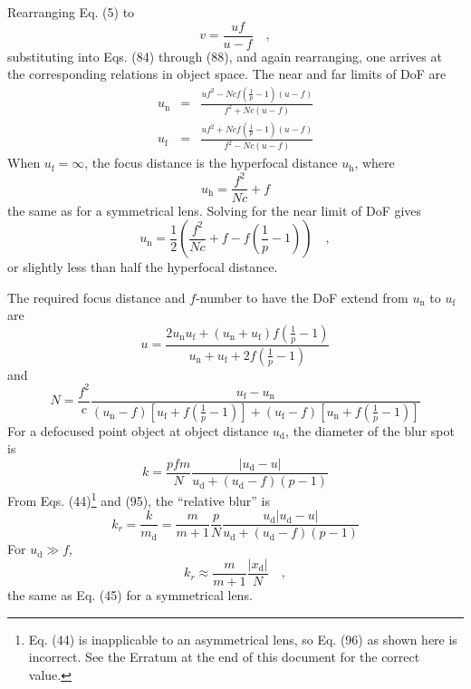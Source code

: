 \documentclass[11pt, oneside]{scrartcl}   	%
\begin{document}
Rearranging Eq. (5) to
\begin{equation}
  \label{eq:5v}
  v = \frac{uf}{u-f}\quad,
\end{equation}
%
substituting into Eqs. (84) through (88), and again rearranging, one
arrives at the corresponding relations in object space. The near and
far limits of DoF are
\begin{eqnarray}
     u_\mathrm{n} & = & \frac{uf^2 -  N\!cf\left(\frac1p-1\right)(u-f)}{f^2 + N\!c(u-f)}\label{eq:89}\\
     u_\mathrm{f} & = & \frac{uf^2 + N\!cf\left(\frac1p-1\right)(u-f)}{f^2 - N\!c(u-f)}\label{eq:90}
\end{eqnarray}
When $u_\mathrm{f} = \infty$, the focus distance is the hyperfocal distance
$u_\mathrm{h}$, where
\begin{equation}
  \label{eq:uh2}
  u_\mathrm{h} = \frac{f^2}{N\!c} + f
\end{equation}
the same as for a symmetrical lens. Solving for the near limit of DoF gives
\begin{equation}
  \label{eq:3un}
  u_\mathrm{n} = \frac12 \left(\frac{f^2}{N\!c} + f - f\left(\frac1p-1\right)\right)\quad,
\end{equation}
or slightly less than half the hyperfocal distance.

The required focus distance and $f$-number to have the DoF extend from
$u_\mathrm{n}$ to $u_\mathrm{f}$ are
\begin{equation}
  \label{eq:93}
  u = \frac{2u_\mathrm{n}u_\mathrm{f} +
    (u_\mathrm{n}+u_\mathrm{f})f\left(\frac1p-1\right)}{u_\mathrm{n}+u_\mathrm{f}+2f\left(\frac1p-1\right)}
\end{equation}
and
\begin{equation}
  \label{eq:94}
  N=\frac{f^2}c\frac{u_\mathrm{f}-u_\mathrm{n}}{(u_\mathrm{n}-f)\left[u_\mathrm{f}+f\left(\frac1p-1\right)\right]+(u_\mathrm{f}-f)\left[u_\mathrm{n}+f\left(\frac1p-1\right)\right]}
\end{equation}
For a defocused point object at object distance $u_\mathrm{d}$, the diameter of
the blur spot is
\begin{equation}
  \label{eq:95}
  k  = \frac{pfm}N\frac{|u_\mathrm{d}-u|}{u_\mathrm{d}+(u_\mathrm{d}-f)(p-1)}
\end{equation}
From Eqs. (44)\footnote{Eq. (44) is inapplicable to an asymmetrical lens, so Eq. (96) as
shown here is incorrect. See the Erratum at the end
of this document for the correct value.} and (95), the “relative blur”
is
\begin{equation}
  \label{eq:96}
  k_r=\frac k {m_\mathrm{d}} = \frac m{m+1} \frac p N
  \frac{u_\mathrm{d}|u_\mathrm{d}-u|}{u_\mathrm{d}+(u_\mathrm{d}-f)(p-1)}
\end{equation}
For $u_\mathrm{d} \gg f$,
\begin{equation}
  \label{eq:97}
  k_r\approx \frac m{m+1} \frac{|x_\mathrm{d}|}N\quad,
\end{equation}
the same as Eq. (45) for a symmetrical lens.
\end{document}
